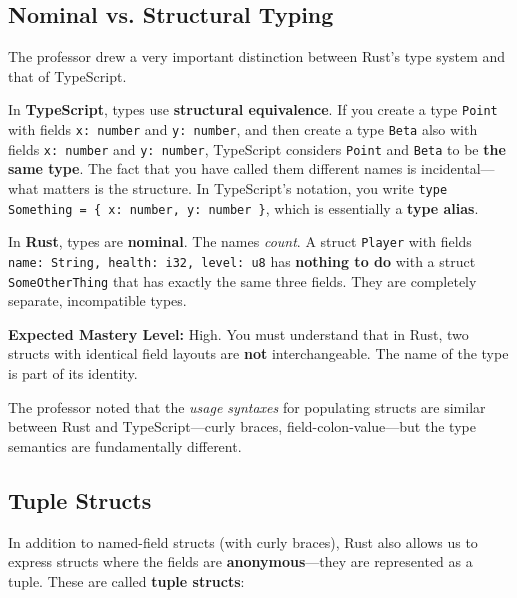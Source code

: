 \subsection{Nominal vs. Structural Typing}

The professor drew a very important distinction between Rust's type system and that of TypeScript.

\begin{examprioritybox}
In \textbf{TypeScript}, types use \textbf{structural equivalence}. If you create a type \texttt{Point} with fields \texttt{x: number} and \texttt{y: number}, and then create a type \texttt{Beta} also with fields \texttt{x: number} and \texttt{y: number}, TypeScript considers \texttt{Point} and \texttt{Beta} to be \textbf{the same type}. The fact that you have called them different names is incidental---what matters is the structure. In TypeScript's notation, you write \texttt{type Something = \{ x: number, y: number \}}, which is essentially a \textbf{type alias}.

In \textbf{Rust}, types are \textbf{nominal}. The names \textit{count}. A struct \texttt{Player} with fields \texttt{name: String, health: i32, level: u8} has \textbf{nothing to do} with a struct \texttt{SomeOtherThing} that has exactly the same three fields. They are completely separate, incompatible types.

\textbf{Expected Mastery Level:} High. You must understand that in Rust, two structs with identical field layouts are \textbf{not} interchangeable. The name of the type is part of its identity.
\end{examprioritybox}

The professor noted that the \textit{usage syntaxes} for populating structs are similar between Rust and TypeScript---curly braces, field-colon-value---but the type semantics are fundamentally different.

\subsection{Tuple Structs}

In addition to named-field structs (with curly braces), Rust also allows us to express structs where the fields are \textbf{anonymous}---they are represented as a tuple. These are called \textbf{tuple structs}:

